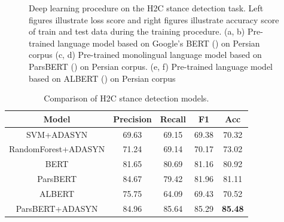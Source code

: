 \begin{figure}
	\qquad
	\qquad
	
	
	\caption{Deep learning procedure on the \ac{H2C} stance detection task. Left figures illustrate loss score and right figures illustrate accuracy score of train and test data during the training procedure. (a, b) Pre-trained language model based on Google's \ac{BERT} (\cite{parsbert}) on Persian corpus (c, d) Pre-trained monolingual language model based on \ac{ParsBERT} (\cite{parsbert}) on Persian corpus. (e, f) Pre-trained language model based on \ac{ALBERT} (\cite{albert}) on Persian corpus}%
	\label{fig:deep}%
\end{figure}

\begin{table}[t]
	\centering
	\small
	\caption{Comparison of \ac{H2C} stance detection models.}
	\def\arraystretch{1.3}%
	\setlength{\extrarowheight}{5pt}%
	\begin{tabular}{|c|c|c|c|c|}
		\hline{Model} & {Precision} & {Recall} & {F1} & {\ac{Acc}}\\
		\hline \hline
		{\ac{SVM}+\ac{ADASYN}} & {69.63} & {69.15} & {69.38} & {70.32}\\
		\hline
		{RandomForest+\ac{ADASYN}} & {71.24} & {69.14} & {70.17} & {73.02}\\
		\hline
		{\ac{BERT}} & {81.65} & {80.69} & {81.16} & {80.92}\\
		\hline
		{\ac{ParsBERT}} & {84.67} & {79.42} & {81.96} & {81.11}\\
		\hline
		{\ac{ALBERT}} & {75.75} & {64.09} & {69.43} & {70.52}\\
		\hline
		{\ac{ParsBERT}+\ac{ADASYN}} & {84.96} & {85.64} & {85.29} & {\textbf{85.48}}\\
		\hline
	\end{tabular}
	\label{tbl:allstance}
\end{table}


